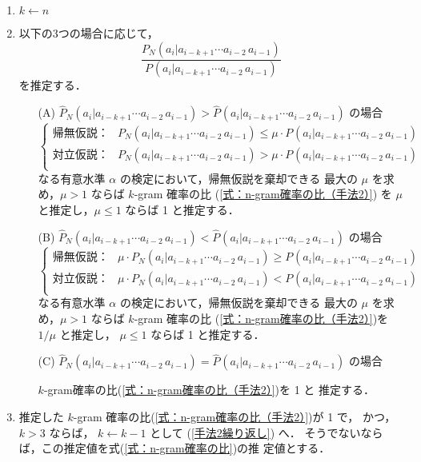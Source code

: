 \documentclass[japanese]{jnlp_1.4}
\newcommand{\NN}{}
\begin{document}
\begin{enumerate}
\item $k\longleftarrow n$

\item \label{手法2繰り返し}
      以下の3つの場合に応じて，
      \begin{equation}\label{式：n-gram確率の比（手法2）}
       \frac{P_N(a_i|a_{i-k+1}\cdots a_{i-2}\,a_{i-1})}
                   {P_{\NN}(a_i|a_{i-k+1}\cdots a_{i-2}\,a_{i-1})}
      \end{equation}
      を推定する．
      \begin{itemize}
       \item[(A)] $\widehat{P}_N(a_i|a_{i-k+1}\cdots a_{i-2}\,a_{i-1}) > 
		  \widehat{P}_{\NN}(a_i|a_{i-k+1}\cdots a_{i-2}\,a_{i-1})$
		  の場合
		  \[
		   \begin{cases}
		    帰無仮説：& 
		     P_N(a_i|a_{i-k+1}\cdots a_{i-2}\,a_{i-1}) \leq 
		     \mu\cdot P_{\NN}(a_i|a_{i-k+1}\cdots a_{i-2}\,a_{i-1})\\
		    対立仮説：&
		     P_N(a_i|a_{i-k+1}\cdots a_{i-2}\,a_{i-1}) >
		     \mu \cdot P_{\NN}(a_i|a_{i-k+1}\cdots a_{i-2}\,a_{i-1})\\
		   \end{cases}
		  \]
		  なる有意水準 $\alpha$ の検定において，帰無仮説を棄却できる
		  最大の $\mu$ を求め，$\mu>1$ ならば $k$-gram 確率の比
		  (\ref{式：n-gram確率の比（手法2）})
		  を $\mu$ と推定し，$\mu\leq 1$ ならば 1 と推定する．
		  
       \item[(B)] $\widehat{P}_N(a_i|a_{i-k+1}\cdots a_{i-2}\,a_{i-1}) < 
		  \widehat{P}_{\NN}(a_i|a_{i-k+1}\cdots a_{i-2}\,a_{i-1})$ 
		  の場合
		  \[
		   \begin{cases}
		    帰無仮説：& 
		     \mu\cdot P_N(a_i|a_{i-k+1}\cdots a_{i-2}\,a_{i-1}) 
		     \geq 
		     P_{\NN}(a_i|a_{i-k+1}\cdots a_{i-2}\,a_{i-1})\\
		    対立仮説：&
		     \mu \cdot P_N(a_i|a_{i-k+1}\cdots a_{i-2}\,a_{i-1}) 
		     <
		     P_{\NN}(a_i|a_{i-k+1}\cdots a_{i-2}\,a_{i-1})\\
		   \end{cases}
		  \]
		  なる有意水準 $\alpha$ の検定において，帰無仮説を棄却できる
		  最大の $\mu$ を求め，$\mu>1$ ならば $k$-gram 確率の比
		  (\ref{式：n-gram確率の比（手法2）})を $1/\mu$ と推定し，
		  $\mu\leq 1$ ならば 1 と推定する．
		  
       \item[(C)] $\widehat{P}_N(a_i|a_{i-k+1}\cdots a_{i-2}\,a_{i-1}) = 
		  \widehat{P}_{\NN}(a_i|a_{i-k+1}\cdots a_{i-2}\,a_{i-1})$
		  の場合
		  
		  $k$-gram確率の比(\ref{式：n-gram確率の比（手法2）})を 1 と
		  推定する．
      \end{itemize}
 \item 推定した $k$-gram 確率の比(\ref{式：n-gram確率の比（手法2）})が 1 で，
      かつ，$k>3$ ならば，
      $k\longleftarrow k-1$ として (\ref{手法2繰り返し}) へ．
      そうでないならば，この推定値を式(\ref{式：n-gram確率の比})の推
      定値とする．
\end{enumerate}
\end{document}
